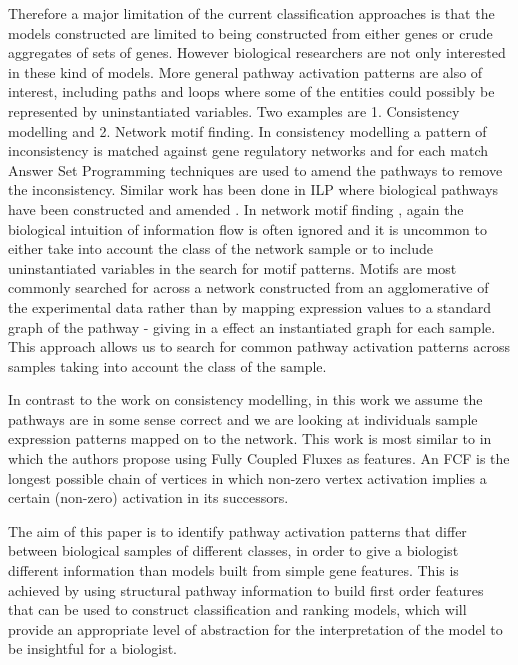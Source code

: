 \documentclass[runningheads,a4paper]{llncs}
\begin{document}
Therefore a major limitation of the current classification approaches is that the models constructed are limited to being constructed from either genes or crude aggregates of sets of genes. However biological researchers are not only interested in these kind of models. More general pathway activation patterns are also of interest, including paths and loops where some of the entities could possibly be represented by uninstantiated variables. Two examples are 1. Consistency modelling and 2. Network motif finding. In consistency modelling \citep{guziolowski2010analysis} a pattern of inconsistency is matched against gene regulatory networks and for each match Answer Set Programming techniques are used to amend the pathways to remove the inconsistency. Similar work has been done in ILP  where biological pathways have been constructed and amended \citep{ray2010automatic}. In network motif finding \citep{kim_biological_2011}, again the biological intuition of information flow is often ignored and it is uncommon to either take into account the class of the network sample or to include uninstantiated variables in the search for motif patterns. Motifs are most commonly searched for across a network constructed from an agglomerative of the experimental data rather than by mapping expression values to a standard graph of the pathway - giving in a effect an instantiated graph for each sample. This approach allows us to search for common pathway activation patterns across samples taking into account the class of the sample. 

In contrast to the work on consistency modelling, in this work we assume the pathways are in some sense correct and we are looking at individuals sample expression patterns mapped on to the network. This work is most similar to  \citep{holec2008using} in which the authors propose using Fully Coupled Fluxes as features. An FCF is the longest possible chain of vertices in which non-zero vertex activation implies a certain (non-zero) activation in its successors.

The aim of this paper is to identify pathway activation patterns that differ between biological samples of different classes, in order to give a biologist different information than models built from simple gene features. This is achieved by using structural pathway information to build first order features that can be used to construct classification and ranking models, which will provide an appropriate level of abstraction for the interpretation of the model to be insightful for a biologist. 
\end{document}
